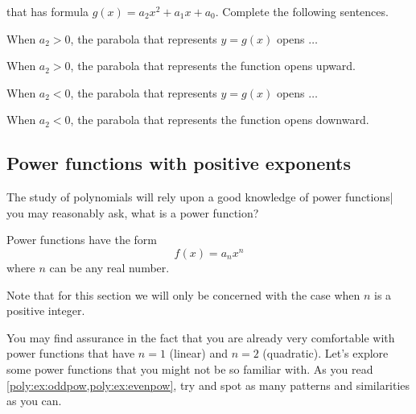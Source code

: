 \begin{essentialskills}
\begin{problem}
that has formula $g(x)=a_2x^2+a_1x+a_0$. Complete the following sentences.
\begin{subproblem}
When $a_2>0$, the parabola that represents $y=g(x)$ opens $\ldots$ 
    \begin{shortsolution}
        When $a_2>0$, the parabola that represents the function opens upward.
    \end{shortsolution}
\end{subproblem}
\begin{subproblem}
When $a_2<0$, the parabola that represents $y=g(x)$ opens $\ldots$ 
    \begin{shortsolution}
        When $a_2<0$, the parabola that represents the function opens downward.
    \end{shortsolution}
\end{subproblem}
\end{problem}
\end{essentialskills}

\subsection*{Power functions with positive exponents}
The study of polynomials will rely upon a good knowledge 
of power functions| you may reasonably ask, what is a power function?
\begin{pccdefinition}
Power functions have the form
\[
    f(x) = a_n x^n
\]
where $n$ can be any real number.

Note that for this section we will only be concerned with the 
case when $n$ is a positive integer.
\end{pccdefinition}

You may find assurance in the fact that you are already very comfortable 
with power functions that have $n=1$ (linear) and $n=2$ (quadratic). Let's 
explore some power functions that you might not be so familiar with.
As you read \cref{poly:ex:oddpow,poly:ex:evenpow}, try and spot 
as many patterns and similarities as you can.

